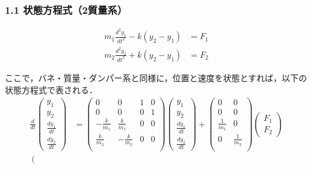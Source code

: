 \begin{frame}[t]
\frametitle{1.1 状態方程式（2質量系）}
\vspace*{-5mm}
\setcounter{eqncountersave}{\value{equation}} %
\addtocounter{equation}{-2} %
\begin{align}
 m_1 \frac{d^2y_1}{dt^2} - k (y_2 - y_1) &= F_1 \\
 m_2 \frac{d^2y_2}{dt^2} + k (y_2 - y_1) &= F_2
\end{align}
\setcounter{equation}{\value{eqncountersave}} %

ここで，バネ・質量・ダンパー系と同様に，位置と速度を状態とすれば，以下の状態方程式で表される．
\begin{align}
 \frac{d}{dt} \left(\begin{array}{c}
               y_1 \\
         y_2 \\
         \frac{dy_1}{dt} \\
         \frac{dy_2}{dt}
        \end{array}\right)
 &=
 \left(\begin{array}{cccc}
        0 & 0 & 1 & 0     \\
        0 & 0 & 0 & 1     \\
  -\frac{k}{m_1} & \frac{k}{m_1} & 0 & 0 \\
  \frac{k}{m_2} & -\frac{k}{m_2} & 0 & 0 \\
       \end{array}\right)
 \left(\begin{array}{c}
        y_1 \\
  y_2 \\
  \frac{dy_1}{dt} \\
  \frac{dy_2}{dt}
       \end{array}\right)
 +
 \left(\begin{array}{cc}
        0 & 0 \\
        0 & 0 \\
  \frac{1}{m_1} & 0 \\
  0 & \frac{1}{m_2} \\
       \end{array}\right)
 \left(\begin{array}{c}
        F_1 \\
  F_2
       \end{array}\right) \\
 \left(\begin{array}{c}

\end{array}
\end{align}
\end{frame}
